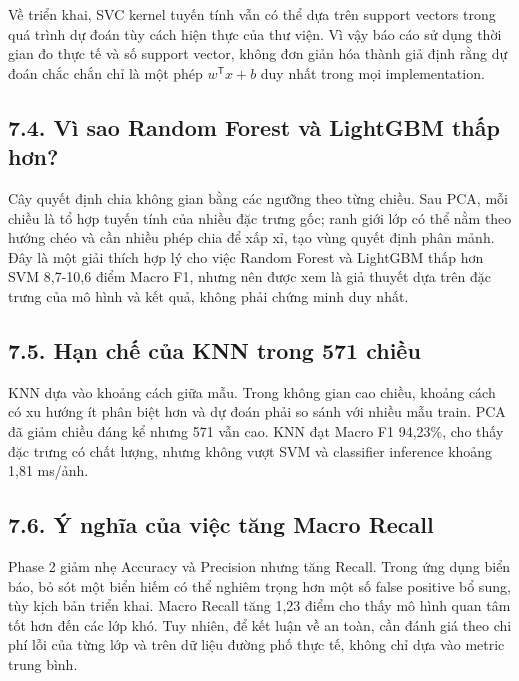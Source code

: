 \documentclass[12pt,a4paper]{article}
\begin{document}
Về triển khai, SVC kernel tuyến tính vẫn có thể dựa trên support vectors
trong quá trình dự đoán tùy cách hiện thực của thư viện. Vì vậy báo cáo
sử dụng thời gian đo thực tế và số support vector, không đơn giản hóa
thành giả định rằng dự đoán chắc chắn chỉ là một phép $w^{\mathsf{T}}x+b$ duy nhất
trong mọi implementation.

\subsection{7.4. Vì sao Random Forest và LightGBM thấp
hơn?}\label{vuxec-sao-random-forest-vuxe0-lightgbm-thux1ea5p-hux1a1n}

Cây quyết định chia không gian bằng các ngưỡng theo từng chiều. Sau PCA,
mỗi chiều là tổ hợp tuyến tính của nhiều đặc trưng gốc; ranh giới lớp có
thể nằm theo hướng chéo và cần nhiều phép chia để xấp xỉ, tạo vùng quyết
định phân mảnh. Đây là một giải thích hợp lý cho việc Random Forest và
LightGBM thấp hơn SVM 8,7-10,6 điểm Macro F1, nhưng nên được xem là giả
thuyết dựa trên đặc trưng của mô hình và kết quả, không phải chứng minh
duy nhất.

\subsection{7.5. Hạn chế của KNN trong 571
chiều}\label{hux1ea1n-chux1ebf-cux1ee7a-knn-trong-571-chiux1ec1u}

KNN dựa vào khoảng cách giữa mẫu. Trong không gian cao chiều, khoảng
cách có xu hướng ít phân biệt hơn và dự đoán phải so sánh với nhiều mẫu
train. PCA đã giảm chiều đáng kể nhưng 571 vẫn cao. KNN đạt Macro F1
94,23\%, cho thấy đặc trưng có chất lượng, nhưng không vượt SVM và
classifier inference khoảng 1,81 ms/ảnh.

\subsection{7.6. Ý nghĩa của việc tăng Macro
Recall}\label{uxfd-nghux129a-cux1ee7a-viux1ec7c-tux103ng-macro-recall}

Phase 2 giảm nhẹ Accuracy và Precision nhưng tăng Recall. Trong ứng dụng
biển báo, bỏ sót một biển hiếm có thể nghiêm trọng hơn một số false
positive bổ sung, tùy kịch bản triển khai. Macro Recall tăng 1,23 điểm
cho thấy mô hình quan tâm tốt hơn đến các lớp khó. Tuy nhiên, để kết
luận về an toàn, cần đánh giá theo chi phí lỗi của từng lớp và trên dữ
liệu đường phố thực tế, không chỉ dựa vào metric trung bình.
\end{document}
